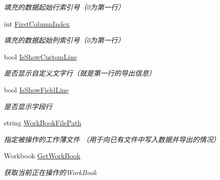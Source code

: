 \begin{DoxyCompactItemize}
\begin{DoxyCompactList}\small\item\em 填充的数据起始行索引号（0为第一行） \end{DoxyCompactList}\item 
int \hyperlink{class_x_c_l_net_tools_1_1_entity_1_1_data_handler_1_1_out_put_param_class_a8c5066b7156aed81b900c3d1ce0b64de}{First\-Column\-Index}
\begin{DoxyCompactList}\small\item\em 填充的数据起始列索引号（0为第一行） \end{DoxyCompactList}\item 
bool \hyperlink{class_x_c_l_net_tools_1_1_entity_1_1_data_handler_1_1_out_put_param_class_ab80767ed7cf9542d0f8829a9a7c950ba}{Is\-Show\-Custom\-Line}
\begin{DoxyCompactList}\small\item\em 是否显示自定义文字行（就是第一行的导出信息） \end{DoxyCompactList}\item 
bool \hyperlink{class_x_c_l_net_tools_1_1_entity_1_1_data_handler_1_1_out_put_param_class_a954b333bc639dba102793fd8eb83cc1d}{Is\-Show\-Field\-Line}
\begin{DoxyCompactList}\small\item\em 是否显示字段行 \end{DoxyCompactList}\item 
string \hyperlink{class_x_c_l_net_tools_1_1_entity_1_1_data_handler_1_1_out_put_param_class_a7f0453621ff08ae63105219ae9108d8a}{Work\-Book\-File\-Path}
\begin{DoxyCompactList}\small\item\em 指定被操作的工作薄文件 （用于向已有文件中写入数据并导出的情况） \end{DoxyCompactList}\item 
Workbook \hyperlink{class_x_c_l_net_tools_1_1_entity_1_1_data_handler_1_1_out_put_param_class_ad481560674ea98e5ca1fcc43cf4d7a62}{Get\-Work\-Book}
\begin{DoxyCompactList}\small\item\em 获取当前正在操作的\-Work\-Book \end{DoxyCompactList}\end{DoxyCompactItemize}



